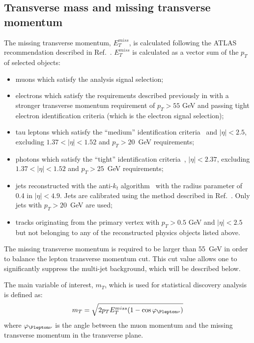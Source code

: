 \subsection{Transverse mass and missing transverse momentum}
\label{subsec:etmiss}
The missing transverse momentum, $E_T^{miss}$, is calculated following the ATLAS recommendation described in Ref.~\cite{met2015_1,met2015_2}.
$E_T^{miss}$ is calculated as a vector sum of the $p_T$ of selected objects:
\begin{itemize}
 \item muons which satisfy the analysis signal selection;
 \item electrons which satisfy the requirements described previously in
  with a stronger transverse momentum requirement of $p_T > 55$ GeV
 and passing tight electron identification criteria (which is the electron signal selection);
 \item tau leptons which satisfy the ``medium'' identification criteria~\cite{tau_id_8TeV} and $|\eta| < 2.5$, excluding  $1.37 < |\eta| < 1.52$ and $p_T > 20$~GeV requirements;
 \item photons which satisfy the ``tight'' identification criteria~\cite{photon_id_2011}, $|\eta| < 2.37$, excluding  $1.37 < |\eta| < 1.52$ and $p_T > 25$~GeV requirements;
 \item jets reconstructed with the anti-$k_t$ algorithm~\cite{jet_anti_kt} with the radius parameter of 0.4 in $|\eta| < 4.9$.
 Jets are calibrated using the method described in Ref.~\cite{jet_calib_syst_13TeV}.
 Only jets with $p_T > 20$~GeV are used;
 \item tracks originating from the primary vertex with $p_T > 0.5$ GeV and $|\eta| < 2.5$ but not belonging to any of the reconstructed physics objects listed above.
\end{itemize}
The missing transverse momentum is required to be larger than 55~GeV in order 
to balance the lepton transverse momentum cut.
This cut value allows one to significantly suppress 
the multi-jet background, which will be described below.


The main variable of interest, $m_T$, which is used for statistical discovery analysis is defined as:
\begin{equation}
 m_T = \sqrt{2 p_T E_T^{miss} (1-\cos\varphi_{\Plepton\nu})}
\end{equation}
where $\varphi_{\Plepton\nu}$ is the angle between the muon momentum and the missing transverse momentum in the transverse plane.

